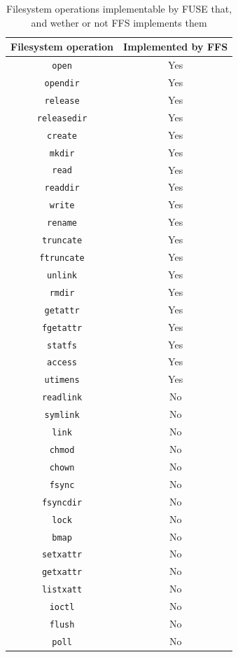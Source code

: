 \begin{table}[!ht]
	\begin{center}
		\caption{Filesystem operations implementable by FUSE that, and wether or not FFS implements them}
		\begin{tabular}{| c | c |}
			
			\hline
			\textbf{Filesystem operation} 	& \textbf{Implemented by FFS}\\
			\hline
			\hline
			\texttt{open} & Yes\\
			\texttt{opendir} & Yes\\
			\texttt{release} & Yes\\
			\texttt{releasedir} & Yes\\
			\texttt{create} & Yes\\
			\texttt{mkdir} & Yes\\
			\texttt{read} & Yes\\
			\texttt{readdir} & Yes\\
			\texttt{write} & Yes\\
			\texttt{rename} & Yes\\
			\texttt{truncate} & Yes\\
			\texttt{ftruncate} & Yes\\
			\texttt{unlink} & Yes\\
			\texttt{rmdir} & Yes\\
			\texttt{getattr} & Yes\\
			\texttt{fgetattr} & Yes\\
			\texttt{statfs} & Yes\\
			\texttt{access} & Yes\\
			\texttt{utimens} & Yes\\
			\texttt{readlink} & No\\
			\texttt{symlink} & No\\
			\texttt{link} & No\\
			\texttt{chmod} & No\\
			\texttt{chown} & No\\
			\texttt{fsync} & No\\
			\texttt{fsyncdir} & No\\
			\texttt{lock} & No\\
			\texttt{bmap} & No\\
			\texttt{setxattr} & No\\
			\texttt{getxattr} & No\\
			\texttt{listxatt} & No\\
			\texttt{ioctl} & No\\
			\texttt{flush} & No\\
			\texttt{poll} & No\\
			\hline

		\end{tabular}
		\label{tbl:fs_impl_op}
	\end{center}
\end{table}

